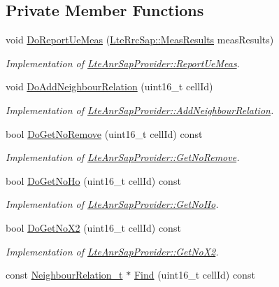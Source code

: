 \subsection*{Private Member Functions}
\begin{DoxyCompactItemize}
\item 
void \hyperlink{classns3_1_1LteAnr_a38b89263374eecf88cd53e426334067e}{Do\+Report\+Ue\+Meas} (\hyperlink{structns3_1_1LteRrcSap_1_1MeasResults}{Lte\+Rrc\+Sap\+::\+Meas\+Results} meas\+Results)
\begin{DoxyCompactList}\small\item\em Implementation of \hyperlink{classns3_1_1LteAnrSapProvider_ac4f1114bd33d0c189e2ce2624089e587}{Lte\+Anr\+Sap\+Provider\+::\+Report\+Ue\+Meas}. \end{DoxyCompactList}\item 
void \hyperlink{classns3_1_1LteAnr_a938fd5dabbd1367a1867fdc73e18a33c}{Do\+Add\+Neighbour\+Relation} (uint16\+\_\+t cell\+Id)
\begin{DoxyCompactList}\small\item\em Implementation of \hyperlink{classns3_1_1LteAnrSapProvider_a43054257bfdafb714e3d3821b82e2e33}{Lte\+Anr\+Sap\+Provider\+::\+Add\+Neighbour\+Relation}. \end{DoxyCompactList}\item 
bool \hyperlink{classns3_1_1LteAnr_a3fc7d47f8c9c225ec9acf4b18cbc3a17}{Do\+Get\+No\+Remove} (uint16\+\_\+t cell\+Id) const 
\begin{DoxyCompactList}\small\item\em Implementation of \hyperlink{classns3_1_1LteAnrSapProvider_adaf22322995ffba65c3d606181dcb6a4}{Lte\+Anr\+Sap\+Provider\+::\+Get\+No\+Remove}. \end{DoxyCompactList}\item 
bool \hyperlink{classns3_1_1LteAnr_aad770645a80e31c8a79103bac0d5e061}{Do\+Get\+No\+Ho} (uint16\+\_\+t cell\+Id) const 
\begin{DoxyCompactList}\small\item\em Implementation of \hyperlink{classns3_1_1LteAnrSapProvider_a825c724cb173ca628ad1fc42f6b86e9f}{Lte\+Anr\+Sap\+Provider\+::\+Get\+No\+Ho}. \end{DoxyCompactList}\item 
bool \hyperlink{classns3_1_1LteAnr_ae18c6d9981b08976d6014e7ee637d732}{Do\+Get\+No\+X2} (uint16\+\_\+t cell\+Id) const 
\begin{DoxyCompactList}\small\item\em Implementation of \hyperlink{classns3_1_1LteAnrSapProvider_a7781c81a1d796484f58a23f4ea44ebd6}{Lte\+Anr\+Sap\+Provider\+::\+Get\+No\+X2}. \end{DoxyCompactList}\item 
const \hyperlink{structns3_1_1LteAnr_1_1NeighbourRelation__t}{Neighbour\+Relation\+\_\+t} $\ast$ \hyperlink{classns3_1_1LteAnr_adf05e409c9c68690843b73df6fed37d5}{Find} (uint16\+\_\+t cell\+Id) const 
\end{DoxyCompactItemize}
